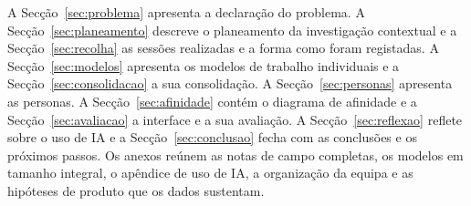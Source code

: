 A Secção~\ref{sec:problema} apresenta a declaração do problema. A Secção~\ref{sec:planeamento} descreve o planeamento da 
investigação contextual e a Secção~\ref{sec:recolha} as sessões realizadas e a forma como foram registadas. A Secção~\ref{sec:modelos} 
apresenta os modelos de trabalho individuais e a Secção~\ref{sec:consolidacao} a sua consolidação. A Secção~\ref{sec:personas} apresenta as 
personas. A Secção~\ref{sec:afinidade} contém o diagrama de afinidade e a Secção~\ref{sec:avaliacao} a interface e a sua avaliação. 
A Secção~\ref{sec:reflexao} reflete sobre o uso de IA e a Secção~\ref{sec:conclusao} fecha com as conclusões e os próximos passos. 
Os anexos reúnem as notas de campo completas, os modelos em tamanho integral, o apêndice de uso de IA, a organização da equipa e as 
hipóteses de produto que os dados sustentam.
